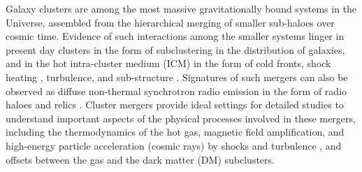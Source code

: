 \documentclass[useASM,usenatbib]{mn2e}
\begin{document}
Galaxy clusters are among the most massive gravitationally bound systems in
the Universe, assembled from the hierarchical merging of
smaller sub-haloes over cosmic time. Evidence of such interactions
among the smaller systems linger in present day clusters in the form
of subclustering in the distribution of galaxies, and in the hot intra-cluster medium
(ICM) in the form of cold fronts, shock heating
\citep{2007PhR...443....1M,0004-637X-716-2-1118}, turbulence, and sub-structure
\citep{2015ApJ...812..153O,2016MNRAS.458..681D,2016MNRAS.460L..84B}. Signatures
of such mergers can also be observed as diffuse 
non-thermal synchrotron radio emission in the form of
radio haloes and relics
\citep[e.g][]{2002NewA....7..249B,2006Sci...314..791B,2011ApJ...736L...8B,
  2012A&ARv..20...54F,2012MNRAS.426...40B}. Cluster mergers provide
ideal settings for detailed studies to understand important aspects
of the physical processes involved in these mergers, including the
thermodynamics of the hot gas, magnetic field amplification, and
high-energy particle acceleration (cosmic rays) by shocks and
turbulence
\citep{2008ApJ...679.1173R,2009A&A...506.1083V,2012MNRAS.426...40B,2015ApJ...798...90Z},
and offsets between the gas and the dark matter (DM) subclusters.
\end{document}
